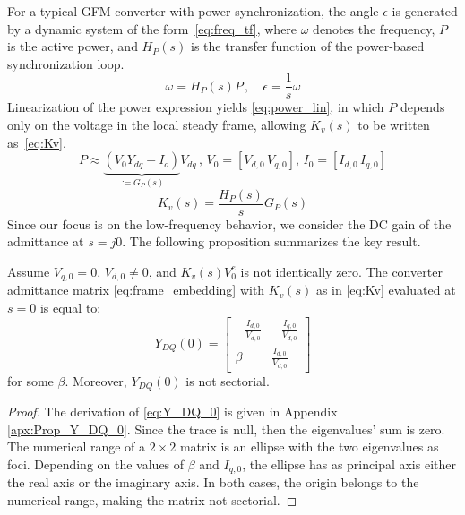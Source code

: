 For a typical GFM converter with power synchronization, the angle $\epsilon$ is generated by a dynamic system of the form~\eqref{eq:freq_tf}, where $\omega$ denotes the frequency, $P$ is the active power, and $H_P(s)$ is the transfer function of the power-based synchronization loop. 
\begin{equation}
    \omega = H_P(s)P\,,\quad \epsilon=\frac{1}{s}\omega
    \label{eq:freq_tf}
\end{equation}
Linearization of the power expression yields \eqref{eq:power_lin}, in which $P$ depends only on the voltage in the local steady frame, allowing $K_v(s)$ to be written as~\eqref{eq:Kv}.
\begin{equation}
    P \approx \underbrace{(V_0 Y_{dq}+I_o)}_{:=G_P(s)} V_{dq}\,,\, V_0=[V_{d,0} \, V_{q,0}], \, I_0=[I_{d,0} \, I_{q,0}]
    \label{eq:power_lin}
\end{equation}
\begin{equation}
    K_v(s) = \frac{H_P(s)}{s}G_P(s)
    \label{eq:Kv}
\end{equation}
Since our focus is on the low-frequency behavior, we consider the DC gain of the admittance at $s=j0$. The following proposition summarizes the key result.
\begin{prop}
    Assume $V_{q,0}=0$, $V_{d,0}\neq0$, and $K_v(s)V_0^e$ is not identically zero. The converter admittance matrix \eqref{eq:frame_embedding} with $K_v(s)$ as in \eqref{eq:Kv} evaluated at $s=0$ is equal to:
\begin{equation}
    Y_{DQ}(0)=\begin{bmatrix}
        -\frac{I_{d,0}}{V_{d,0}} & -\frac{I_{q,0}}{V_{d,0}} \\
        \beta & \frac{I_{d,0}}{V_{d,0}}
    \end{bmatrix}
    \label{eq:Y_DQ_0}
\end{equation}
for some $\beta$. Moreover, $Y_{DQ}(0)$ is not sectorial.
\label{prop:Y_DQ_0}
\end{prop}
\begin{proof}
    The derivation of \eqref{eq:Y_DQ_0} is given in Appendix \ref{apx:Prop_Y_DQ_0}. 
    Since the trace is null, then the eigenvalues' sum is zero. The numerical range of a $2\times2$ matrix is an ellipse with the two eigenvalues as foci. Depending on the values of $\beta$ and $I_{q,0}$, the ellipse has as principal axis either the real axis or the imaginary axis. In both cases, the origin belongs to the numerical range, making the matrix not sectorial.
\end{proof}

